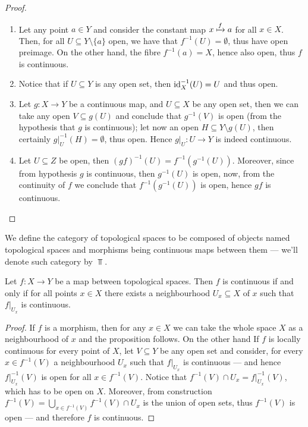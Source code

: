 \begin{proof}
\begin{enumerate}[(1)]\setlength\itemsep{0em}
\item Let any point \(a \in Y\) and consider the constant map \(x \xmapsto f a\)
  for all \(x \in X\). Then, for all \(U \subseteq Y \setminus \{a\}\) open, we
  have that \(f^{-1}(U) = \emptyset\), thus have open preimage. On the other
  hand, the fibre \(f^{-1}(a) = X\), hence also open, thus \(f\) is continuous.

\item Notice that if \(U \subseteq Y\) is any open set, then \(\operatorname{id}_X^{-1}(U) =
  U\) and thus open.

\item Let \(g : X \to Y\) be a continuous map, and \(U \subseteq X\) be any open
  set, then we can take any open \(V \subseteq g(U)\) and conclude that
  \(g^{-1}(V)\) is open (from the hypothesis that \(g\) is continuous); let now
  an open \(H \subseteq Y \setminus g(U)\), then certainly \(g|_U^{-1}(H) =
  \emptyset\), thus open. Hence \(g|_U : U \to Y\) is indeed continuous.

\item Let \(U \subseteq Z\) be open, then \((g f)^{-1}(U) = f^{-1}
  (g^{-1}(U))\). Moreover, since from hypothesis \(g\) is continuous, then
  \(g^{-1}(U)\) is open, now, from the continuity of \(f\) we conclude that
  \(f^{-1}(g^{-1}(U))\) is open, hence \(g f\) is continuous.
\end{enumerate}
\end{proof}

\begin{definition}
We define the category of topological spaces to be composed of objects named
topological spaces and morphisms being continuous maps between them --- we'll
denote such category by \(\Top\).
\end{definition}

\begin{proposition}
\label{prop: local criterion for continuity}
Let \(f: X \to Y\) be a map between topological spaces. Then \(f\) is continuous
if and only if for all points \(x \in X\) there exists a neighbourhood \(U_x
\subseteq X\) of \(x\) such that \(f|_{U_x}\) is continuous.
\end{proposition}

\begin{proof}
If \(f\) is a morphism, then for any \(x \in X\) we can take the whole space
\(X\) as a neighbourhood of \(x\) and the proposition follows. On the other hand
If \(f\) is locally continuous for every point of \(X\), let \(V \subseteq Y\)
be any open set and consider, for every \(x \in f^{-1}(V)\) a neighbourhood
\(U_x\) such that \(f|_{U_x}\) is continuous --- and hence \(f|_{U_x}^{-1}(V)\)
is open for all \(x \in f^{-1}(V)\). Notice that \(f^{-1}(V) \cap U_x =
f|_{U_x}^{-1}(V)\), which has to be open on \(X\). Moreover, from construction
\(f^{-1}(V) = \bigcup_{x \in f^{-1}(V)} f^{-1}(V) \cap U_x\) is the union of
open sets, thus \(f^{-1}(V)\) is open --- and therefore \(f\) is continuous.
\end{proof}

